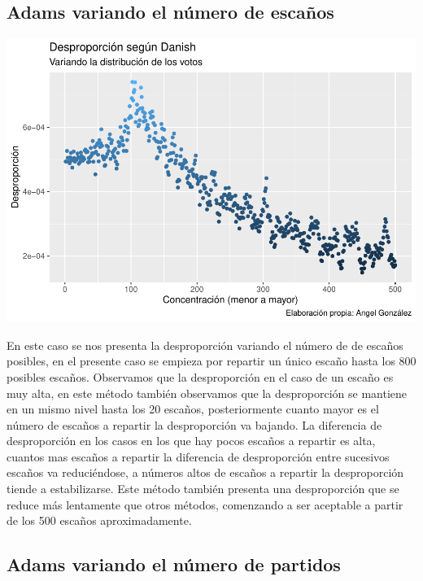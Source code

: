 \documentclass[12pt,a4paper,]{book}
\numberwithin{dummy}{section}
\theoremstyle{ocrenumbox}
\theoremstyle{blacknumex}
\theoremstyle{blacknumbox}
\theoremstyle{ocrenum}
\theoremstyle{ocrenum}
\begin{document}
\hypertarget{adams-variando-el-nuxfamero-de-escauxf1os}{%
\subsection{Adams variando el número de
escaños}\label{adams-variando-el-nuxfamero-de-escauxf1os}}

\begin{center}\includegraphics[width=0.95\linewidth]{figurasR/unnamed-chunk-38-1} \end{center}

En este caso se nos presenta la desproporción variando el número de de
escaños posibles, en el presente caso se empieza por repartir un único
escaño hasta los 800 posibles escaños. Observamos que la desproporción
en el caso de un escaño es muy alta, en este método también observamos
que la desproporción se mantiene en un mismo nivel hasta los 20 escaños,
posteriormente cuanto mayor es el número de escaños a repartir la
desproporción va bajando. La diferencia de desproporción en los casos en
los que hay pocos escaños a repartir es alta, cuantos mas escaños a
repartir la diferencia de desproporción entre sucesivos escaños va
reduciéndose, a números altos de escaños a repartir la desproporción
tiende a estabilizarse. Este método también presenta una desproporción
que se reduce más lentamente que otros métodos, comenzando a ser
aceptable a partir de los 500 escaños aproximadamente.

\hypertarget{adams-variando-el-nuxfamero-de-partidos}{%
\subsection{Adams variando el número de
partidos}\label{adams-variando-el-nuxfamero-de-partidos}}
\end{document}
